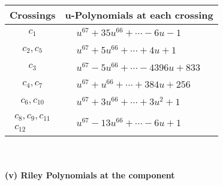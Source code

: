 \documentclass[1p]{elsarticle_modified}
\theoremstyle{definition}
\begin{document}
\begin{tabular}{m{50pt}|m{274pt}}
Crossings & \hspace{64pt}u-Polynomials at each crossing \\
\hline $$\begin{aligned}c_{1}\end{aligned}$$&$\begin{aligned}
&u^{67}+35 u^{66}+\cdots-6 u-1
\end{aligned}$\\
\hline $$\begin{aligned}c_{2},c_{5}\end{aligned}$$&$\begin{aligned}
&u^{67}+5 u^{66}+\cdots+4 u+1
\end{aligned}$\\
\hline $$\begin{aligned}c_{3}\end{aligned}$$&$\begin{aligned}
&u^{67}-5 u^{66}+\cdots-4396 u+833
\end{aligned}$\\
\hline $$\begin{aligned}c_{4},c_{7}\end{aligned}$$&$\begin{aligned}
&u^{67}+u^{66}+\cdots+384 u+256
\end{aligned}$\\
\hline $$\begin{aligned}c_{6},c_{10}\end{aligned}$$&$\begin{aligned}
&u^{67}+3 u^{66}+\cdots+3 u^2+1
\end{aligned}$\\
\hline $$\begin{aligned}c_{8},c_{9},c_{11}\\c_{12}\end{aligned}$$&$\begin{aligned}
&u^{67}-13 u^{66}+\cdots-6 u+1
\end{aligned}$\\
\hline
\end{tabular}\\~\\
\newpage\renewcommand{\arraystretch}{1}
\flushleft \textbf{(v) Riley Polynomials at the component}\newline \\
\end{document}
